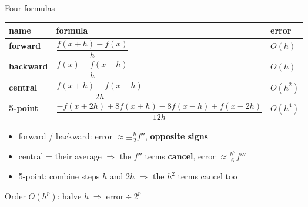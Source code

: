 \documentclass[aspectratio=169]{beamer}
\newcommand{\cbox}[2]{\colorbox{#1}{\ensuremath{\displaystyle #2}}}
\begin{document}
\begin{frame}{Four formulas}
\centering
\small
\setlength{\tabcolsep}{10pt}\renewcommand{\arraystretch}{1.3}
\begin{tabular}{@{}lll@{}}
\toprule
name & formula & error \\ \midrule\addlinespace[4pt]
\textcolor{accent}{\textbf{forward}} & $\dfrac{f(x+h)-f(x)}{h}$ & $O(h)$ \\[7pt]
\textcolor{hl}{\textbf{backward}} & $\dfrac{f(x)-f(x-h)}{h}$ & $O(h)$ \\[7pt]
\textcolor{gr}{\textbf{central}} & $\dfrac{f(x+h)-f(x-h)}{2h}$ & $O(h^2)$ \\[7pt]
\textbf{5-point} & $\dfrac{-f(x+2h)+8f(x+h)-8f(x-h)+f(x-2h)}{12h}$ & $O(h^4)$ \\
\bottomrule
\end{tabular}

\vspace{0.3em}
\footnotesize
\begin{minipage}{0.80\textwidth}
\begin{itemize}
\item forward / backward: error $\approx \pm\frac{h}{2}f''$, \textbf{opposite signs}
\item central = their average $\Rightarrow$ the $f''$ terms \textbf{cancel}, error $\approx \frac{h^2}{6}f'''$
\item 5-point: combine steps $h$ and $2h$ $\Rightarrow$ the $h^2$ terms cancel too
\end{itemize}
\end{minipage}

\vspace{0.3em}
\cbox{accent!12}{\text{Order } O(h^p)\text{: halve } h \;\Rightarrow\; \text{error} \div 2^p}
\end{frame}
\end{document}
